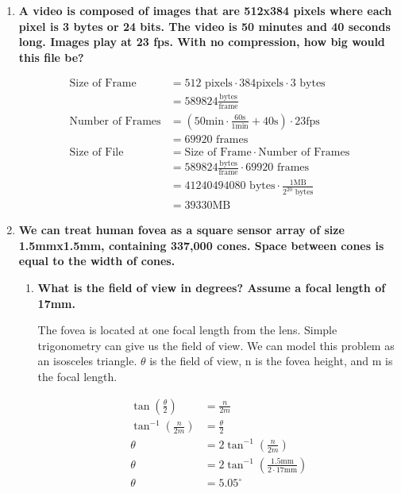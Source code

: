 \begin{enumerate}[font=\bfseries]

    \item \textbf{A video is composed of images that are 512x384 pixels where
    each pixel is 3 bytes or 24 bits. The video is 50 minutes and 40 seconds
    long. Images play at 23 fps. With no compression, how big would this file
    be?}

    \begin{align*}
	\text{Size of Frame} &= 512\text{ pixels}\cdot384\text{
	pixels}\cdot3\text{ bytes} \\
	&= 589824\frac{\text{bytes}}{\text{frame}} \\
	\text{Number of Frames} &=
	\left(50\text{min}\cdot\frac{60\text{s}}{1\text{min}}+40\text{s}\right)
	\cdot23\text{fps} \\
	&= 69920\text{ frames} \\
	\text{Size of File} &= \text{Size of Frame}\cdot
	\text{Number of Frames} \\
	&= 589824\frac{\text{bytes}}{\text{frame}}\cdot69920\text{ frames} \\
	&= 41240494080\text{ bytes}\cdot\frac{1\text{MB}}{2^{20}\text{ bytes}} \\
	&= 39330\text{MB}
    \end{align*}

    \item \textbf{We can treat human fovea as a square sensor array of size
    1.5mmx1.5mm, containing 337,000 cones. Space between cones is equal to the
    width of cones.}
    \begin{enumerate}[label=\alph*., font=\bfseries]
	\item \textbf{What is the field of view in degrees? Assume a focal
	length of 17mm.}

	The fovea is located at one focal length from the lens. Simple
	trigonometry can give us the field of view. We can model this problem as
	an isosceles triangle. $\theta$ is the field of view, n is the fovea
	height, and m is the focal length.

	\begin{align*}
	    \tan\left(\frac{\theta}{2}\right) &= \frac{n}{2m} \\
	    \tan^{-1}\left(\frac{n}{2m}\right) &= \frac{\theta}{2} \\
	    \theta &= 2\tan^{-1}\left(\frac{n}{2m}\right) \\
	    \theta &= 2\tan^{-1}\left(\frac{1.5\text{mm}}{2\cdot17\text{mm}}\right) \\
	    \theta &= 5.05^{\circ} 
	\end{align*}


\end{enumerate}
\end{enumerate}
